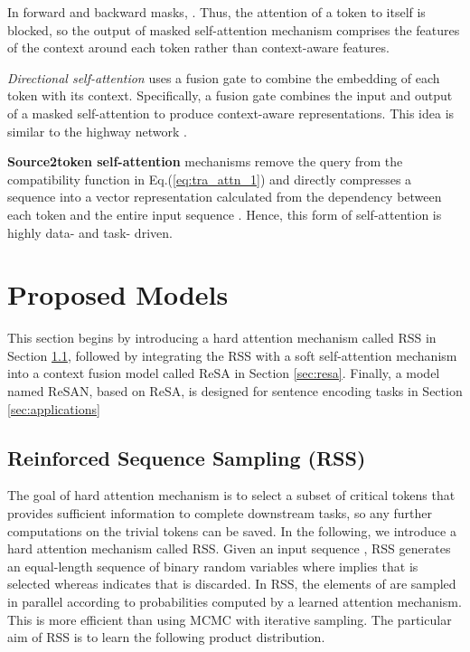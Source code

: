 \documentclass{article}
\begin{document}
In forward and backward masks, . Thus, the attention of a token to itself is blocked, so the output of masked self-attention mechanism comprises the features of the context around each token rather than context-aware features. 

\textit{Directional self-attention} uses a fusion gate to combine the embedding of each token with its context. Specifically, a fusion gate combines the input and output of a masked self-attention to produce context-aware representations. This idea is similar to the highway network \cite{srivastava2015highway}. 

\textbf{Source2token self-attention} mechanisms \cite{shen2017disan} remove the query  from the compatibility function in Eq.(\ref{eq:tra_attn_1}) and directly compresses a sequence into a vector representation calculated from the dependency between each token  and the entire input sequence . Hence, this form of self-attention is highly data- and task- driven. 

\section{Proposed Models}

This section begins by introducing a hard attention mechanism called RSS in Section \ref{sec:hard_attention}, followed by integrating the RSS with a soft self-attention mechanism into a context fusion model called ReSA in Section \ref{sec:resa}. Finally, a model named ReSAN, based on ReSA, is designed for sentence encoding tasks in Section \ref{sec:applications}

\subsection{Reinforced Sequence Sampling (RSS)} \label{sec:hard_attention}

The goal of hard attention mechanism is to select a subset of critical tokens that provides sufficient information to complete downstream tasks, so any further computations on the trivial tokens can be saved. In the following, we introduce a hard attention mechanism called RSS. Given an input sequence , RSS generates an equal-length sequence of binary random variables  where  implies that  is selected whereas  indicates that  is discarded. In RSS, the elements of  are sampled in parallel according to probabilities computed by a learned attention mechanism. This is more efficient than using MCMC with iterative sampling. The particular aim of RSS is to learn the following product distribution.
\end{document}
